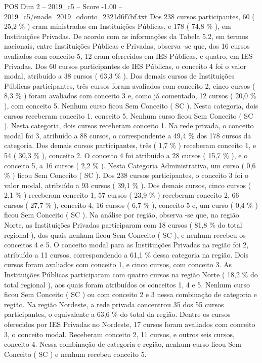 \begin{textsample}{POS Dim 2 – 2019\_c5 – Score -1.00 – 2019\_c5/enade\_2019\_odonto\_2321d6f7bf.txt}
Dos 238 cursos participantes, 60 ( 25,2 \% ) eram ministrados em Instituições Públicas, e 178 ( 74,8 \% ), em Instituições Privadas.
De acordo com as informações da Tabela 5.2, em termos nacionais, entre Instituições Públicas e Privadas, observa -se que, dos 16 cursos avaliados com conceito 5, 12 eram oferecidos em IES Públicas, e quatro, em IES Privadas.
Dos 60 cursos participantes de IES Públicas, o conceito 4 foi o valor modal, atribuído a 38 cursos ( 63,3 \% ).
Dos demais cursos de Instituições Públicas participantes, três cursos foram avaliados com conceito 2, cinco cursos ( 8,3 \% ) foram avaliados com conceito 3 e, como já comentado, 12 cursos ( 20,0 \% ), com conceito 5.
Nenhum curso ficou Sem Conceito ( SC ).
Nesta categoria, dois cursos receberam conceito 1. conceito 5.
Nenhum curso ficou Sem Conceito ( SC ).
Nesta categoria, dois cursos receberam conceito 1.
Na rede privada, o conceito modal foi 3, atribuído a 88 cursos, o correspondente a 49,4 \% dos 178 cursos da categoria.
Dos demais cursos participantes, três ( 1,7 \% ) receberam conceito 1, e 54 ( 30,3 \% ), conceito 2.
O conceito 4 foi atribuído a 28 cursos ( 15,7 \% ), e o conceito 5, a 16 cursos ( 2,2 \% ).
Nesta Categoria Administrativa, um curso ( 0,6 \% ) ficou Sem Conceito ( SC ).
Dos 238 cursos participantes, o conceito 3 foi o valor modal, atribuído a 93 cursos ( 39,1 \% ).
Dos demais cursos, cinco cursos ( 2,1 \% ) receberam conceito 1, 57 cursos ( 23,9 \% ) receberam conceito 2, 66 cursos ( 27,7 \% ), conceito 4, 16 cursos ( 6,7 \% ), conceito 5 e, um curso ( 0,4 \% ) ficou Sem Conceito ( SC ).
Na análise por região, observa -se que, na região Norte, as Instituições Privadas participaram com 18 cursos ( 81,8 \% do total regional ), dos quais nenhum ficou Sem Conceito ( SC ), e nenhum recebeu os conceitos 4 e 5.
O conceito modal para as Instituições Privadas na região foi 2, atribuído a 11 cursos, correspondendo a 61,1 \% dessa categoria na região.
Dois cursos foram avaliados com conceito 1, e cinco cursos, com conceito 3.
As Instituições Públicas participaram com quatro cursos na região Norte ( 18,2 \% do total regional ), aos quais foram atribuídos os conceitos 1, 4 e 5.
Nenhum curso ficou Sem Conceito ( SC ) ou com conceito 2 e 3 nessa combinação de categoria e região.
Na região Nordeste, a rede privada concentrou 35 dos 55 cursos participantes, o equivalente a 63,6 \% do total da região.
Dentre os cursos oferecidos por IES Privadas no Nordeste, 17 cursos foram avaliados com conceito 3, o conceito modal.
Receberam conceito 2, 11 cursos, e outros seis cursos, conceito 4.
Nessa combinação de categoria e região, nenhum curso ficou Sem Conceito ( SC ) e nenhum recebeu conceito 5.

\end{textsample}
